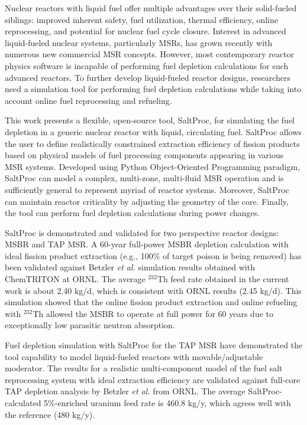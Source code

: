Nuclear reactors with liquid fuel offer multiple advantages over their 
solid-fueled siblings: improved inherent safety, fuel utilization, thermal
efficiency, online reprocessing, and potential for nuclear fuel cycle closure. 
Interest in advanced liquid-fueled nuclear systems, particularly \glspl{MSR}, 
has grown recently with numerous new commercial \gls{MSR} concepts. However, 
most contemporary reactor physics software is incapable of performing fuel 
depletion calculations for such advanced reactors. To further develop 
liquid-fueled reactor designs, researchers need a simulation tool for 
performing fuel depletion calculations while taking into account online fuel 
reprocessing and refueling. 

This work presents a flexible, open-source tool, SaltProc, for simulating the 
fuel depletion in a generic nuclear reactor with liquid, circulating fuel.
SaltProc allows the user to define realistically constrained extraction 
efficiency of fission products based on physical models of fuel processing 
components appearing in various \gls{MSR} systems.  Developed using Python 
Object-Oriented Programming paradigm, SaltProc can model a complex, 
multi-zone, multi-fluid \gls{MSR} operation and is sufficiently general to 
represent myriad of reactor systems. Moreover, SaltProc can maintain reactor 
criticality by adjusting the geometry of the core.  Finally, the tool can 
perform fuel depletion calculations during power changes.

SaltProc is demonstrated and validated for two perspective reactor designs: 
\gls{MSBR} and \gls{TAP} \gls{MSR}. A 60-year full-power \gls{MSBR} depletion 
calculation with ideal fission product extraction (e.g., 
100\% of target poison is being removed) has been validated against Betzler 
\emph{et al.} simulation results obtained with ChemTRITON at ORNL. The average 
$^{232}$Th feed rate obtained in the current work is about 2.40 kg/d, which is 
consistent with ORNL results (2.45 kg/d). This simulation showed that the 
online fission product extraction and online refueling with $^{232}$Th allowed 
the \gls{MSBR} to operate at full power for 60 years due to exceptionally low 
parasitic neutron absorption.

Fuel depletion simulation with SaltProc for the \gls{TAP} \gls{MSR} have 
demonstrated the tool capability to model liquid-fueled reactors with 
movable/adjustable moderator. The results for a realistic multi-component 
model of the fuel salt reprocessing system with ideal extraction 
efficiency are validated against full-core \gls{TAP} depletion analysis by 
Betzler \emph{et al.} from ORNL. The average SaltProc-calculated 5\%-enriched 
uranium feed rate is 460.8 kg/y, which agrees well with the reference (480 
kg/y). %

